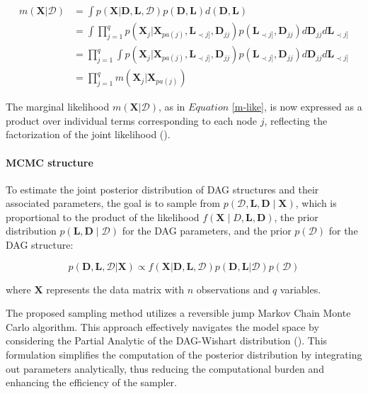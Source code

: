\documentclass{report}
\begin{document}
\begin{equation} \label{m-like}
	\begin{split}
		m(\mathbf{X}|\mathcal{D}) & = \int p(\mathbf{X} | \mathbf{D}, \mathbf{L}, \mathcal{D})p(\mathbf{D}, \mathbf{L}) d(\mathbf{D}, \mathbf{L}) \\
		& = \int \prod_{j=1}^q p(\mathbf{X}_j | \mathbf{X}_{pa(j)}, \mathbf{L}_{\prec j ]}, \mathbf{D}_{jj})p(\mathbf{L}_{\prec j ]}, \mathbf{D}_{jj})d \mathbf{D}_{jj}d \mathbf{L}_{\prec j ]} \\
		& = \prod_{j=1}^q \int p(\mathbf{X}_j | \mathbf{X}_{pa(j)}, \mathbf{L}_{\prec j ]}, \mathbf{D}_{jj})p(\mathbf{L}_{\prec j ]}, \mathbf{D}_{jj})d \mathbf{D}_{jj}d \mathbf{L}_{\prec j ]} \\
		& = \prod_{j=1}^q m(\mathbf{X}_j | \mathbf{X}_{pa(j)})
	\end{split}
\end{equation}

The marginal likelihood $m(\mathbf{X}|\mathcal{D})$, as in $\textit{Equation}$ \ref{m-like}, is now expressed as a product over individual terms corresponding to each node $j$, reflecting the factorization of the joint likelihood (\citet{castelletti2022bcdag}). 

\paragraph{MCMC structure}
To estimate the joint posterior distribution of DAG structures and their associated parameters, the goal is to sample from $p(\mathcal{D}, \mathbf{L}, \mathbf{D} \mid \mathbf{X})$, which is proportional to the product of the likelihood $f(\mathbf{X} \mid D, \mathbf{L}, \mathbf{D})$, the prior distribution $p(\mathbf{L}, \mathbf{D} \mid \mathcal{D})$ for the DAG parameters, and the prior $p(\mathcal{D})$ for the DAG structure:

\begin{equation}
	p(\mathbf{D}, \mathbf{L}, \mathcal{D} | \mathbf{X}) \propto f(\mathbf{X} | \mathbf{D}, \mathbf{L}, \mathcal{D})p(\mathbf{D}, \mathbf{L} | \mathcal{D})p(\mathcal{D})
\end{equation}

where $\mathbf{X}$ represents the data matrix with $n$ observations and $q$ variables.

The proposed sampling method utilizes a reversible jump Markov Chain Monte Carlo algorithm. This approach effectively navigates the model space by considering the Partial Analytic of the DAG-Wishart distribution (\citet{castelletti2022bcdag}). This formulation simplifies the computation of the posterior distribution by integrating out parameters analytically, thus reducing the computational burden and enhancing the efficiency of the sampler.
\end{document}
